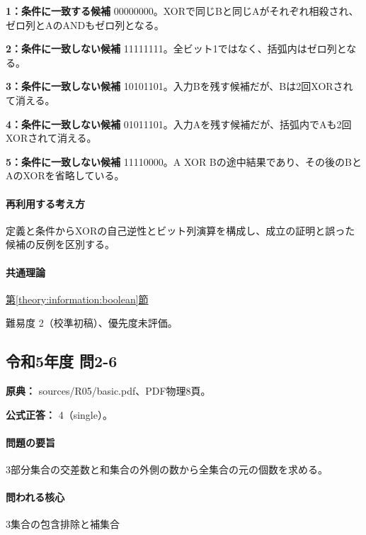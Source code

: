 \noindent\textbf{1：条件に一致する候補} 00000000。XORで同じBと同じAがそれぞれ相殺され、ゼロ列とAのANDもゼロ列となる。\par

\noindent\textbf{2：条件に一致しない候補} 11111111。全ビット1ではなく、括弧内はゼロ列となる。\par

\noindent\textbf{3：条件に一致しない候補} 10101101。入力Bを残す候補だが、Bは2回XORされて消える。\par

\noindent\textbf{4：条件に一致しない候補} 01011101。入力Aを残す候補だが、括弧内でAも2回XORされて消える。\par

\noindent\textbf{5：条件に一致しない候補} 11110000。A XOR Bの途中結果であり、その後のBとAのXORを省略している。\par

\paragraph{再利用する考え方} 定義と条件からXORの自己逆性とビット列演算を構成し、成立の証明と誤った候補の反例を区別する。

\paragraph{共通理論} \hyperref[theory:information:boolean]{第\ref*{theory:information:boolean}節}

\par 難易度 2（校準初稿）、優先度未評価。

\subsection{令和5年度 問2-6}
\label{q:r05-reg-basic-2-6}

\noindent\textbf{原典：} sources/R05/basic.pdf、PDF物理8頁。

\textbf{公式正答：} 4（single）。

\paragraph{問題の要旨} 3部分集合の交差数と和集合の外側の数から全集合の元の個数を求める。

\paragraph{問われる核心} 3集合の包含排除と補集合

